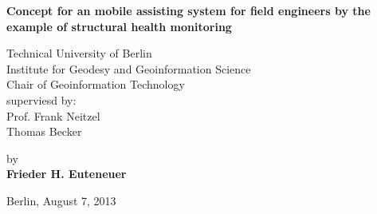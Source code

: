 \begin{center}
\vspace*{\fill}

    {\Large{\bf Concept for an mobile assisting system for field engineers by the example of structural health monitoring}} \vspace{0.5cm}


    {\normalsize Technical University of Berlin \\
    Institute for Geodesy and Geoinformation Science \\
	Chair of Geoinformation Technology\\
	superviesd by:\\	
	Prof. Frank Neitzel\\
	Thomas Becker}\vspace{1cm}

    {\normalsize by \\\vspace{0.5cm}
    {\bf Frieder H. Euteneuer}} \vspace{1cm}
		

    {\normalsize Berlin, August 7, 2013}
\vfill
\end{center}
